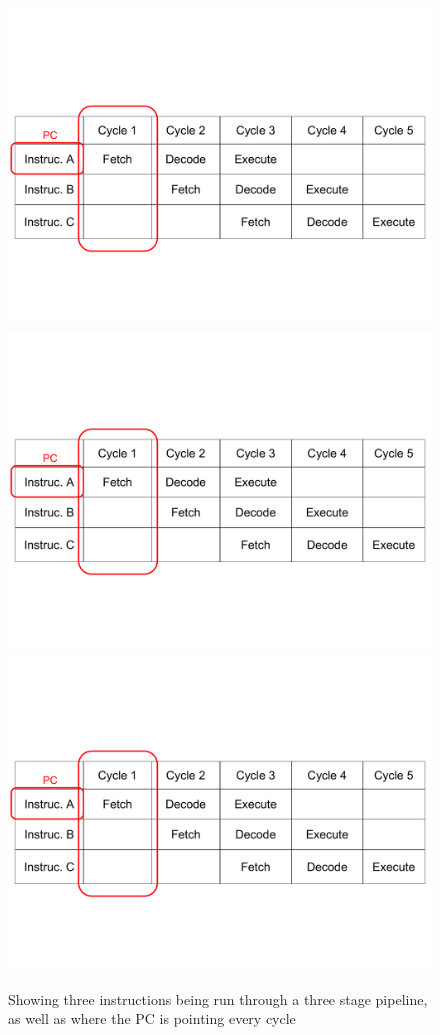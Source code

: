 \begin{figure}
\includegraphics[page=1, clip=true, trim=1mm 40mm 1mm 57mm, width=\textwidth]{./week2/pipeline}
\includegraphics[page=2, clip=true, trim=1mm 40mm 1mm 57mm, width=\textwidth]{./week2/pipeline}
\includegraphics[page=3, clip=true, trim=1mm 40mm 1mm 57mm, width=\textwidth]{./week2/pipeline}
\caption{Showing three instructions being run through a three stage pipeline, as well as where the PC is pointing every cycle}
\label{fig:pipeline}
\end{figure}

